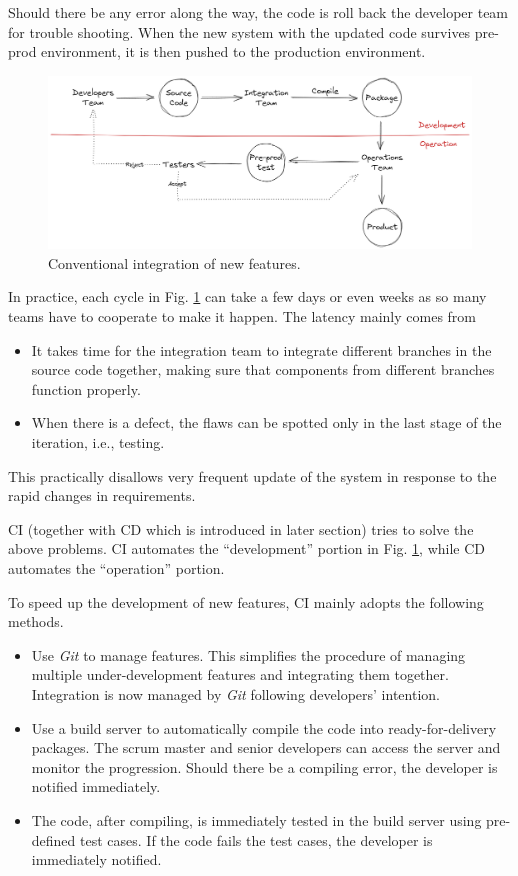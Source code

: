 Should there be any error along the way, the code is roll back the developer team for trouble shooting. When the new system with the updated code survives pre-prod environment, it is then pushed to the production environment.

\begin{figure}
	\centering
	\includegraphics[width=350pt]{chapters/ap/figures/conventionalintegration.png}
	\caption{Conventional integration of new features.} \label{ch:cicd:fig:conventionalintegration}
\end{figure}

In practice, each cycle in Fig. \ref{ch:cicd:fig:conventionalintegration} can take a few days or even weeks as so many teams have to cooperate to make it happen. The latency mainly comes from
\begin{itemize}
	\item It takes time for the integration team to integrate different branches in the source code together, making sure that components from different branches function properly.
	\item When there is a defect, the flaws can be spotted only in the last stage of the iteration, i.e., testing.
\end{itemize}
This practically disallows very frequent update of the system in response to the rapid changes in requirements.

CI (together with CD which is introduced in later section) tries to solve the above problems. CI automates the ``development'' portion in Fig. \ref{ch:cicd:fig:conventionalintegration}, while CD automates the ``operation'' portion.

To speed up the development of new features, CI mainly adopts the following methods.
\begin{itemize}
	\item Use \textit{Git} to manage features. This simplifies the procedure of managing multiple under-development features and integrating them together. Integration is now managed by \textit{Git} following developers' intention.
	\item Use a build server to automatically compile the code into ready-for-delivery packages. The scrum master and senior developers can access the server and monitor the progression. Should there be a compiling error, the developer is notified immediately.
	\item The code, after compiling, is immediately tested in the build server using pre-defined test cases. If the code fails the test cases, the developer is immediately notified.
\end{itemize}


